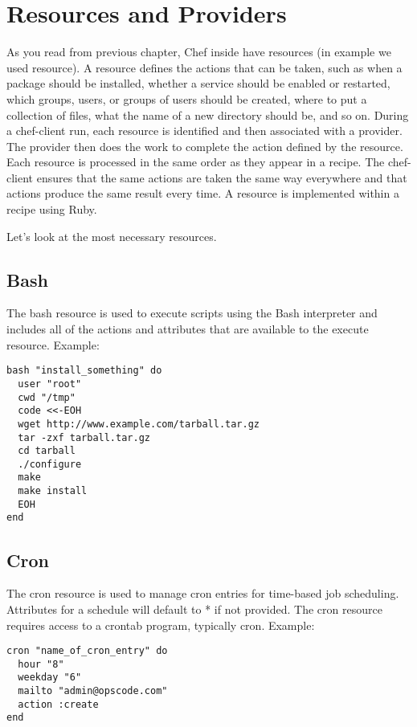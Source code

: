 \section{Resources and Providers}

As you read from previous chapter, Chef inside have resources (in example we used  resource). A resource defines the actions that can be taken, such as when a package should be installed, whether a service should be enabled or restarted, which groups, users, or groups of users should be created, where to put a collection of files, what the name of a new directory should be, and so on. During a chef-client run, each resource is identified and then associated with a provider. The provider then does the work to complete the action defined by the resource. Each resource is processed in the same order as they appear in a recipe. The chef-client ensures that the same actions are taken the same way everywhere and that actions produce the same result every time. A resource is implemented within a recipe using Ruby.

Let's look at the most necessary resources.

\subsection{Bash}

The bash resource is used to execute scripts using the Bash interpreter and includes all of the actions and attributes that are available to the execute resource. Example:

\begin{lstlisting}[label=lst:cookbook-resources-bash]
bash "install_something" do
  user "root"
  cwd "/tmp"
  code <<-EOH
  wget http://www.example.com/tarball.tar.gz
  tar -zxf tarball.tar.gz
  cd tarball
  ./configure
  make
  make install
  EOH
end
\end{lstlisting}

\subsection{Cron}

The cron resource is used to manage cron entries for time-based job scheduling. Attributes for a schedule will default to * if not provided. The cron resource requires access to a crontab program, typically cron. Example:

\begin{lstlisting}[label=lst:cookbook-resources-cron1]
cron "name_of_cron_entry" do
  hour "8"
  weekday "6"
  mailto "admin@opscode.com"
  action :create
end
\end{lstlisting}

